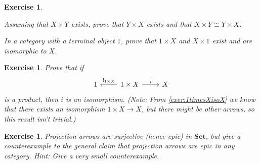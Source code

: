\documentclass[article, a4paper, 11pt, oneside]{memoir}
\numberwithin{equation}{chapter}
\newcommand{\ncat}[1]{\mathbf{#1}} %
\newcommand{\catSet}{\ncat{Set}}
\theoremstyle{myexample}
\newtheorem{exercise}[theorem]{Exercise}
\theoremstyle{myexamplebreak}
\newtheorem{exercisebreak}[theorem]{Exercise}
\begin{document}
\begin{exercisebreak}
    \begin{enumexercise}        
        \item Assuming that $X \times Y$ exists, prove that $Y \times X$ exists and that $X \times Y \cong Y \times X$.

        \item \label{exer:1timesXisoX} In a category with a terminal object $1$, prove that $1 \times X$ and $X \times 1$ exist and are isomorphic to $X$.
    \end{enumexercise}
\end{exercisebreak}


\begin{exercise}
    Prove that if
    \begin{equation*}
        \begin{tikzcd}
            1
            & 1 \times X
                \ar[l, "!_{1 \times X}", swap]
                \ar[r, "i"]
            & X
        \end{tikzcd}
    \end{equation*}
    is a product, then $i$ is an isomorphism. (Note: From \cref{exer:1timesXisoX} we know that there \emph{exists} an isomorphism $1 \times X \to X$, but there might be other arrows, so this result isn't trivial.)
\end{exercise}


\begin{exercise}
    Projection arrows are surjective (hence epic) in $\catSet$, but give a counterexample to the general claim that projection arrows are epic in any category. \emph{Hint:} Give a very small counterexample.
\end{exercise}
\end{document}
